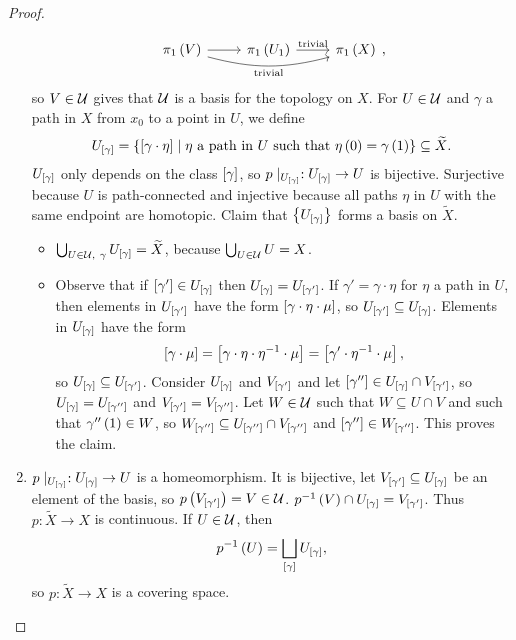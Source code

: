 \begin{proof}
\begin{enumerate}
$$\begin{tikzcd}
\pi_1\rb{V} \arrow{r} \arrow[bend right=15, swap]{rr}{\text{trivial}} & \pi_1\rb{U_1} \arrow{r}{\text{trivial}} & \pi_1\rb{X}
\end{tikzcd},
$$
so $ V \in \UU $ gives that $ \UU $ is a basis for the topology on $ X $. For $ U \in \UU $ and $ \gamma $ a path in $ X $ from $ x_0 $ to a point in $ U $, we define
$$ U_{\sb{\gamma}} = \cb{\sb{\gamma \cdot \eta} \mid \eta \ \text{a path in} \ U \ \text{such that} \ \eta\rb{0} = \gamma\rb{1}} \subseteq \widetilde{X}. $$
$ U_{\sb{\gamma}} $ only depends on the class $ \sb{\gamma} $, so $ p \mid_{U_{\sb{\gamma}}} : U_{\sb{\gamma}} \to U $ is bijective. Surjective because $ U $ is path-connected and injective because all paths $ \eta $ in $ U $ with the same endpoint are homotopic. Claim that $ \cb{U_{\sb{\gamma}}} $ forms a basis on $ \widetilde{X} $.
\begin{itemize}
\item $ \bigcup_{U \in \UU, \ \gamma} U_{\sb{\gamma}} = \widetilde{X} $, because $ \bigcup_{U \in \UU} U = X $.
\item Observe that if $ \sb{\gamma'} \in U_{\sb{\gamma}} $ then $ U_{\sb{\gamma}} = U_{\sb{\gamma'}} $. If $ \gamma' = \gamma \cdot \eta $ for $ \eta $ a path in $ U $, then elements in $ U_{\sb{\gamma'}} $ have the form $ \sb{\gamma \cdot \eta \cdot \mu} $, so $ U_{\sb{\gamma'}} \subseteq U_{\sb{\gamma}} $. Elements in $ U_{\sb{\gamma}} $ have the form
$$ \sb{\gamma \cdot \mu} = \sb{\gamma \cdot \eta \cdot \eta^{-1} \cdot \mu} = \sb{\gamma' \cdot \eta^{-1} \cdot \mu}, $$
so $ U_{\sb{\gamma}} \subseteq U_{\sb{\gamma'}} $. Consider $ U_{\sb{\gamma}} $ and $ V_{\sb{\gamma'}} $ and let $ \sb{\gamma''} \in U_{\sb{\gamma}} \cap V_{\sb{\gamma'}} $, so $ U_{\sb{\gamma}} = U_{\sb{\gamma''}} $ and $ V_{\sb{\gamma'}} = V_{\sb{\gamma''}} $. Let $ W \in \UU $ such that $ W \subseteq U \cap V $ and such that $ \gamma''\rb{1} \in W $, so $ W_{\sb{\gamma''}} \subseteq U_{\sb{\gamma''}} \cap V_{\sb{\gamma''}} $ and $ \sb{\gamma''} \in W_{\sb{\gamma''}} $. This proves the claim.
\end{itemize}
\item $ p \mid_{U_{\sb{\gamma}}} : U_{\sb{\gamma}} \to U $ is a homeomorphism. It is bijective, let $ V_{\sb{\gamma'}} \subseteq U_{\sb{\gamma}} $ be an element of the basis, so $ p\rb{V_{\sb{\gamma'}}} = V \in \UU $. $ p^{-1}\rb{V} \cap U_{\sb{\gamma}} = V_{\sb{\gamma'}} $. Thus $ p : \widetilde{X} \to X $ is continuous. If $ U \in \UU $, then
$$ p^{-1}\rb{U} = \bigsqcup_{\sb{\gamma}} U_{\sb{\gamma}}, $$
so $ p : \widetilde{X} \to X $ is a covering space.

\end{enumerate}
\end{proof}
